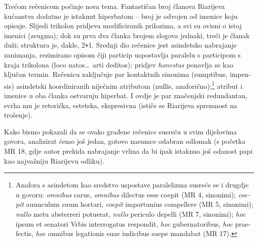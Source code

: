 \documentclass[a5paper,twoside]{article}
\begin{document}
Trećom rečenicom počinje nova tema. Fantastičan broj članova Riarijeva kućanstva dodatno je istaknut hiperbatom – broj je odvojen od imenice koju opisuje. Slijedi trikolon pridjeva modificiranih prilozima, a svi su ovisni o istoj imenici (zeugma); dok su prva dva članka brojem slogova jednaki, treći je članak duži; struktura je, dakle, 2{}\verb!+!1. Srednji dio rečenice jest asindetsko nabrajanje zanimanja, rezimirano opisom čiji particip uspostavlja paralelu s participom s kraja trikolona \textlatin{(loco natos\dots\ arti deditos);} pridjev \textit{honestus} ponavlja se kao ključan termin. Rečenicu zaključuje par kontaktnih sinonima \textlatin{(sumptibus, impensis)} asindetski koordiniranih niječnim atributom \textlatin{(nullis,} anaforično);\footnote{Anafora s asindetom kao sredstvo uspostave paralelizma susreće se i drugdje u govoru: \textlatin{\textit{omnibus} carus, \textit{omnibus} dilectus esse coepit (MR 4, sinonimi); \textit{coepit} auunculum suum hortari, \textit{coepit} importunius compellere (MR 5, sinonimi); \textit{nullo} metu absterreri potuerat, \textit{nullo} periculo depelli (MR 7, sinonimi); \textit{hoc} ipsum et senatori Vrbis interrogatus respondit, \textit{hoc} gubernatoribus, \textit{hoc} praefectis, \textit{hoc} omnibus legationis suae iudicibus saepe mandabat (MR 17).}} atribut i imenice u oba članka ostvaruju hiperbat. I ovdje je par značenjski redundantan, svrha mu je retorička, estetska, ekspresivna (ističe se Riarijeva spremnost na trošenje).

Kako bismo pokazali da se ovako građene rečenice susreću u svim dijelovima govora, analizirat ćemo još jedan, gotovo nasumce odabran odlomak (s početka MR 18, gdje autor prekida nabrajanje vrlina da bi ipak istaknuo još odanost papi kao najvažniju Riarijevu odliku).
\end{document}
